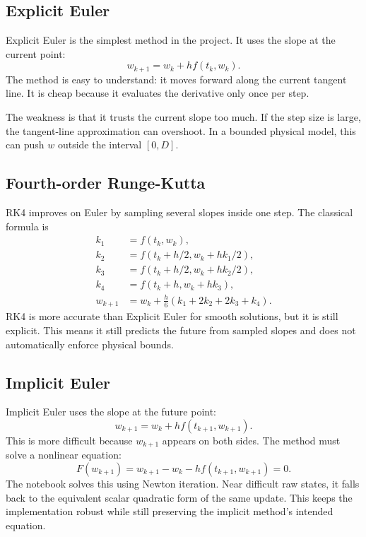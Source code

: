 \documentclass[11pt]{article}
\begin{document}
\subsection{Explicit Euler}

Explicit Euler is the simplest method in the project. It uses the slope at the current point:
\[
w_{k+1} = w_k + h f(t_k,w_k).
\]
The method is easy to understand: it moves forward along the current tangent line. It is cheap because it evaluates the derivative only once per step.

The weakness is that it trusts the current slope too much. If the step size is large, the tangent-line approximation can overshoot. In a bounded physical model, this can push \(w\) outside the interval \([0,D]\).

\subsection{Fourth-order Runge-Kutta}

RK4 improves on Euler by sampling several slopes inside one step. The classical formula is
\[
\begin{aligned}
k_1 &= f(t_k,w_k),\\
k_2 &= f(t_k+h/2,w_k+h k_1/2),\\
k_3 &= f(t_k+h/2,w_k+h k_2/2),\\
k_4 &= f(t_k+h,w_k+h k_3),\\
w_{k+1} &= w_k + \frac{h}{6}(k_1+2k_2+2k_3+k_4).
\end{aligned}
\]
RK4 is more accurate than Explicit Euler for smooth solutions, but it is still explicit. This means it still predicts the future from sampled slopes and does not automatically enforce physical bounds.

\subsection{Implicit Euler}

Implicit Euler uses the slope at the future point:
\[
w_{k+1} = w_k + h f(t_{k+1},w_{k+1}).
\]
This is more difficult because \(w_{k+1}\) appears on both sides. The method must solve a nonlinear equation:
\[
F(w_{k+1}) = w_{k+1} - w_k - h f(t_{k+1},w_{k+1}) = 0.
\]
The notebook solves this using Newton iteration. Near difficult raw states, it falls back to the equivalent scalar quadratic form of the same update. This keeps the implementation robust while still preserving the implicit method's intended equation.
\end{document}

